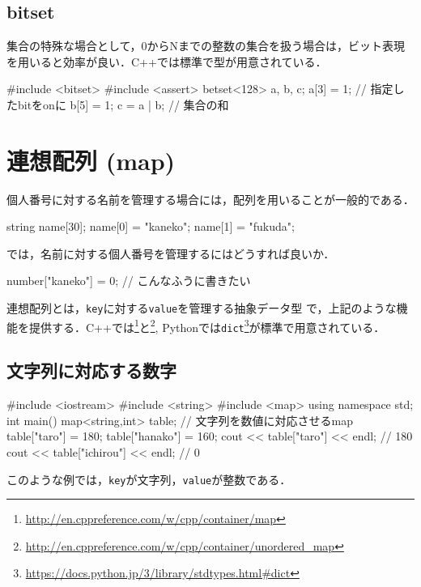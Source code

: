 \subsection{bitset}
集合の特殊な場合として，0からNまでの整数の集合を扱う場合は，ビット表現を用いると効率が良い．C++では標準で型が用意されている．

\begin{cbox}
#include <bitset>
#include <assert>
betset<128> a, b, c;
a[3] = 1; // 指定したbitをonに
b[5] = 1;
c = a | b; // 集合の和
\end{cbox}

\section{連想配列 (map)}

個人番号に対する名前を管理する場合には，配列を用いることが一般的である．

\begin{cbox}
string name[30];
name[0] = "kaneko";
name[1] = "fukuda";
\end{cbox}

では，名前に対する個人番号を管理するにはどうすれば良いか．

\begin{cbox}
number["kaneko"] = 0; // こんなふうに書きたい
\end{cbox}

連想配列とは，\texttt{key}に対する\texttt{value}を管理する抽象データ型
で，上記のような機能を提供する．C++では\footnote{\url{http://en.cppreference.com/w/cpp/container/map}}と\footnote{\url{http://en.cppreference.com/w/cpp/container/unordered_map}}, Pythonでは\texttt{dict}\footnote{\url{https://docs.python.jp/3/library/stdtypes.html\#dict}}が標準で用意されている．

\subsection{文字列に対応する数字}

\begin{cbox}[emph={map}]
#include <iostream>
#include <string>
#include <map>
using namespace std;
int main() {
  map<string,int> table; // 文字列を数値に対応させるmap
  table["taro"] = 180;
  table["hanako"] = 160;
  cout << table["taro"] << endl; // 180
  cout << table["ichirou"] << endl; // 0
}  
\end{cbox}

このような例では，\texttt{key}が文字列，\texttt{value}が整数である．

